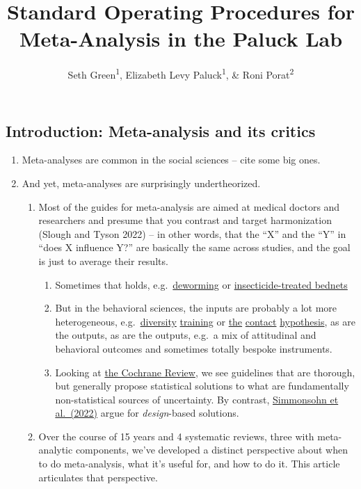 \documentclass[
  man]{apa6}
\title{Standard Operating Procedures for Meta-Analysis in the Paluck Lab}
\author{Seth Green\textsuperscript{1}, Elizabeth Levy Paluck\textsuperscript{1}, \& Roni Porat\textsuperscript{2}}
\date{}
\affiliation{\vspace{0.5cm}\textsuperscript{1} Princeton University\\\textsuperscript{2} Hebrew University, Jerusalem}
\providecommand{\tightlist}{%
  \setlength{\itemsep}{0pt}\setlength{\parskip}{0pt}}
\begin{document}
\maketitle

\subsection{Introduction: Meta-analysis and its critics}\label{introduction-meta-analysis-and-its-critics}

\begin{enumerate}
\def\labelenumi{\arabic{enumi}.}
\tightlist
\item
  Meta-analyses are common in the social sciences -- cite some big ones.
\item
  And yet, meta-analyses are surprisingly undertheorized.

  \begin{enumerate}
  \def\labelenumii{\arabic{enumii}.}
  \tightlist
  \item
    Most of the guides for meta-analysis are aimed at medical doctors and researchers and presume that you contrast and target harmonization (Slough and Tyson 2022) -- in other words, that the ``X'' and the ``Y'' in ``does X influence Y?'' are basically the same across studies, and the goal is just to average their results.

    \begin{enumerate}
    \def\labelenumiii{\arabic{enumiii}.}
    \tightlist
    \item
      Sometimes that holds, e.g.~\href{https://scholar.harvard.edu/files/kremer/files/meta-analysis_deworming_world_bank_working_paper_dec_2016.pdf}{deworming} or \href{https://www.mmv.org/sites/default/files/uploads/docs/access/SMC_Tool_Kit/publications/Meremikww-ipt-review.pdf}{insecticide-treated bednets}
    \item
      But in the behavioral sciences, the inputs are probably a lot more heterogeneous, e.g.~\href{https://psycnet.apa.org/record/2016-43598-001}{diversity} \href{https://compass.onlinelibrary.wiley.com/doi/10.1111/spc3.12741?af=R}{training} or \href{https://pubmed.ncbi.nlm.nih.gov/16737372/}{the} \href{https://psycnet.apa.org/record/2015-07056-001}{contact} \href{https://journals.sagepub.com/doi/abs/10.1177/1088868318762647}{hypothesis}, as are the outputs, as are the outputs, e.g.~a mix of attitudinal and behavioral outcomes and sometimes totally bespoke instruments.
    \item
      Looking at \href{https://training.cochrane.org/handbook/current/chapter-10}{the Cochrane Review}, we see guidelines that are thorough, but generally propose statistical solutions to what are fundamentally non-statistical sources of uncertainty. By contrast, \href{https://www.nature.com/articles/s44159-022-00101-8}{Simmonsohn et al.~(2022)} argue for \emph{design}-based solutions.
    \end{enumerate}
  \item
    Over the course of 15 years and 4 systematic reviews, three with meta-analytic components, we've developed a distinct perspective about when to do meta-analysis, what it's useful for, and how to do it. This article articulates that perspective.


\end{enumerate}
\end{enumerate}
\end{document}
